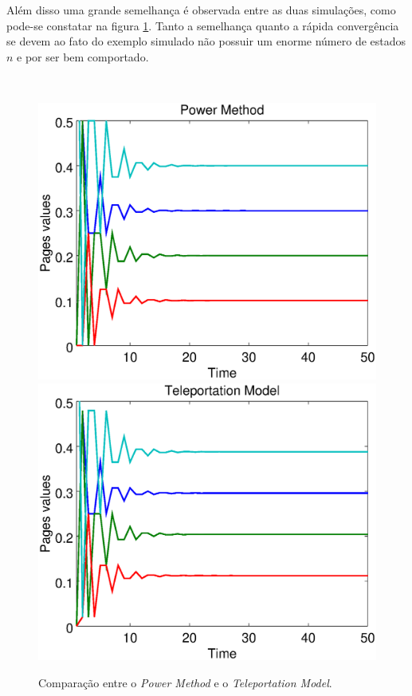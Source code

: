 Além disso uma grande semelhança é observada entre as duas simulações, como pode-se constatar na figura \ref{powertele}. Tanto a semelhança quanto a rápida convergência se devem ao fato do exemplo simulado não possuir um enorme número de estados $n$ e por ser bem comportado.

\
\begin{figure}[!htb]
	\centering
	\includegraphics[scale=0.35]{imagens/powermethod}
	\hspace{0.1cm}
	\includegraphics[scale=0.35]{imagens/teleportation}
	\caption{Comparação entre o \textit{Power Method} e o \textit{Teleportation Model}.}
	\label{powertele}
\end{figure}

